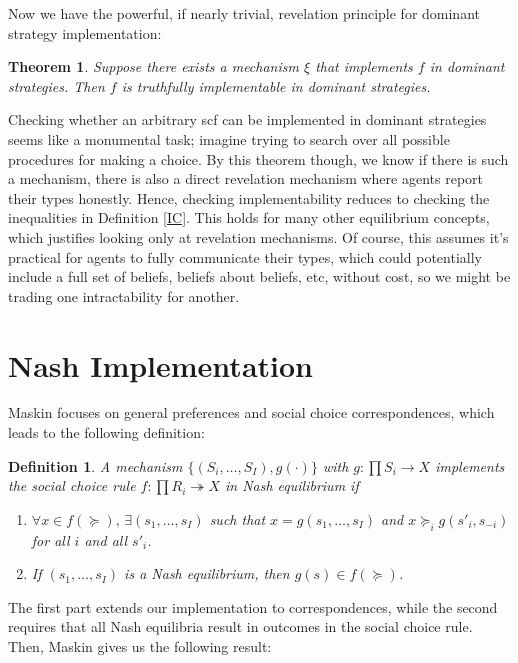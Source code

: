 \documentclass[letter, 10pt]{article}
\theoremstyle{basic}
\newtheorem{definition}{Definition}[section]
\newtheorem{theorem}{Theorem}[section]
\begin{document}
\begin{spacing}{1.0}
Now we have the powerful, if nearly trivial,
revelation principle for dominant strategy implementation:
\begin{theorem}
  Suppose there exists a mechanism $\xi$ that implements
  $f$ in dominant strategies. Then $f$ is truthfully
  implementable in dominant strategies.
\end{theorem}

Checking whether an arbitrary scf can be implemented in dominant strategies
seems like a monumental task; imagine trying to search over all possible
procedures for making a choice. By this theorem though, we know if there is
such a mechanism, there is also a direct revelation mechanism where
agents report their types honestly. Hence, checking implementability
reduces to checking the inequalities in Definition \ref{IC}. This
holds for many other equilibrium concepts, which justifies looking only at
revelation mechanisms. Of course, this assumes it's practical for agents to
fully communicate their types, which could potentially include a full set
of beliefs, beliefs about beliefs, etc, without cost, so we might be
trading one intractability for another.

\section{Nash Implementation}
\label{sec:nash-implementation}

Maskin focuses on general preferences and social choice correspondences,
which leads to the following definition:

\begin{definition}
  A mechanism $\{(S_i, \ldots, S_I), g(\cdot)\}$ with
  $g:\prod S_i \to X$ implements the social choice
  rule $f: \prod R_i \twoheadrightarrow X$ in Nash
  equilibrium if
  \begin{enumerate}
  \item $\forall x \in f(\succeq), \, \exists (s_1, \ldots,
    s_I)$ such that $x = g(s_1, \ldots, s_I)$ and $x \succeq_i g(s'_i, s_{-i})$ for all $i$ and all $s'_i$.
  \item If $(s_1, \ldots, s_I)$ is a Nash equilibrium,
    then $g(s) \in f(\succeq)$.
  \end{enumerate}
\end{definition}

The first part extends our implementation to
correspondences, while the second requires that all Nash
equilibria result in outcomes in the social choice
rule. Then, Maskin gives us the following result:


\end{spacing}
\end{document}
